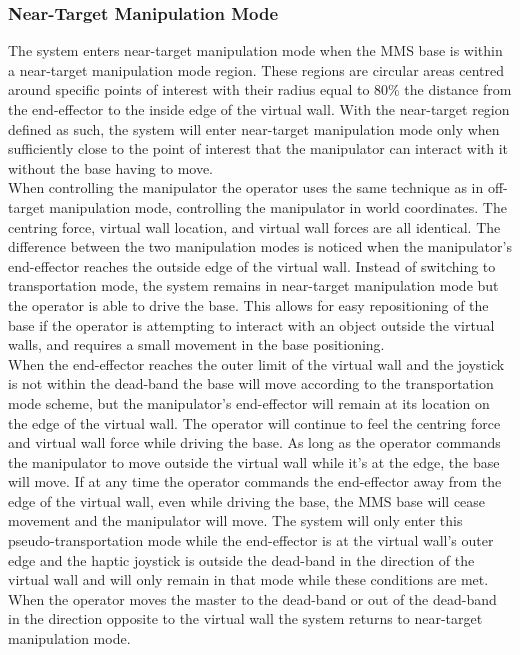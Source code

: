 \documentclass[onecolumn,10pt,final]{asme2ej}
\begin{document}
\subsubsection{Near-Target Manipulation Mode}

The system enters near-target manipulation mode when the MMS base is within a near-target manipulation mode region. These regions are circular areas centred around specific points of interest with their radius equal to 80\% the distance from the end-effector to the inside edge of the virtual wall. With the near-target region defined as such, the system will enter near-target manipulation mode only when sufficiently close to the point of interest that the manipulator can interact with it without the base having to move.\\

When controlling the manipulator the operator uses the same technique as in off-target manipulation mode, controlling the manipulator in world coordinates. The centring force, virtual wall location, and virtual wall forces are all identical. The difference between the two manipulation modes is noticed when the manipulator's end-effector reaches the outside edge of the virtual wall. Instead of switching to transportation mode, the system remains in near-target manipulation mode but the operator is able to drive the base. This allows for easy repositioning of the base if the operator is attempting to interact with an object outside the virtual walls, and requires a small movement in the base positioning.\\

When the end-effector reaches the outer limit of the virtual wall and the joystick is not within the dead-band the base will move according to the transportation mode scheme, but the manipulator's end-effector will remain at its location on the edge of the virtual wall. The operator will continue to feel the centring force and virtual wall force while driving the base. As long as the operator commands the manipulator to move outside the virtual wall while it's at the edge, the base will move. If at any time the operator commands the end-effector away from the edge of the virtual wall, even while driving the base, the MMS base will cease movement and the manipulator will move. The system will only enter this pseudo-transportation mode while the end-effector is at the virtual wall's outer edge and the haptic joystick is outside the dead-band in the direction of the virtual wall and will only remain in that mode while these conditions are met. When the operator moves the master to the dead-band or out of the dead-band in the direction opposite to the virtual wall the system returns to near-target manipulation mode.\\
\end{document}
